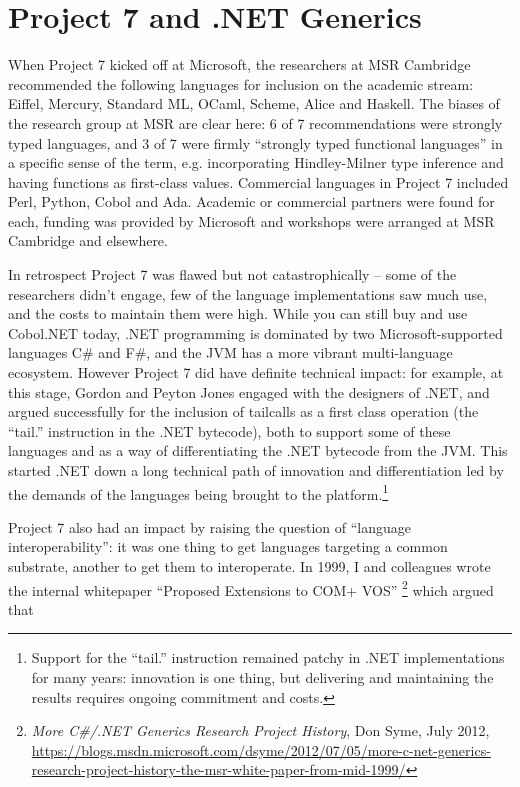 \documentclass[acmsmall,review]{acmart}\settopmatter{printfolios=true,printccs=false,printacmref=false}
\begin{document}
\section*{Project 7 and .NET Generics}

When Project 7 kicked off at Microsoft, the researchers at MSR Cambridge recommended the following languages for inclusion on the academic stream: Eiffel, Mercury, Standard ML, OCaml, Scheme, Alice and Haskell.  The biases of the research group at MSR are clear here: 6 of 7 recommendations were strongly typed languages, and 3 of 7 were firmly “strongly typed functional languages” in a specific sense of the term, e.g. incorporating Hindley-Milner type inference and having functions as first-class values. Commercial languages in Project 7 included Perl, Python, Cobol and Ada. Academic or commercial partners were found for each, funding was provided by Microsoft and workshops were arranged at MSR Cambridge and elsewhere.

In retrospect Project 7 was flawed but not catastrophically – some of the researchers didn’t engage, few of the language implementations saw much use, and the costs to maintain them were high. While you can still buy and use Cobol.NET today, .NET programming is dominated by two Microsoft-supported languages C\# and F\#, and the JVM has a more vibrant multi-language ecosystem. However Project 7 did have definite technical impact: for example, at this stage, Gordon and Peyton Jones engaged with the designers of .NET, and argued successfully for the inclusion of tailcalls as a first class operation (the “tail.” instruction in the .NET bytecode), both to support some of these languages and as a way of differentiating the .NET bytecode from the JVM.  This started .NET down a long technical path of innovation and differentiation led by the demands of the languages being brought to the platform.\footnote{ Support for the “tail.” instruction remained patchy in .NET implementations for many years: innovation is one thing, but delivering and maintaining the results requires ongoing commitment and costs.}

Project 7 also had an impact by raising the question of “language interoperability”: it was one thing to get languages targeting a common substrate, another to get them to interoperate.  In 1999, I and colleagues wrote the internal whitepaper “Proposed Extensions to COM+ VOS” \footnote{ \textit{More C\#/.NET Generics Research Project History}, Don Syme, July 2012,  \url{https://blogs.msdn.microsoft.com/dsyme/2012/07/05/more-c-net-generics-research-project-history-the-msr-white-paper-from-mid-1999/} } which argued that 
\end{document}
